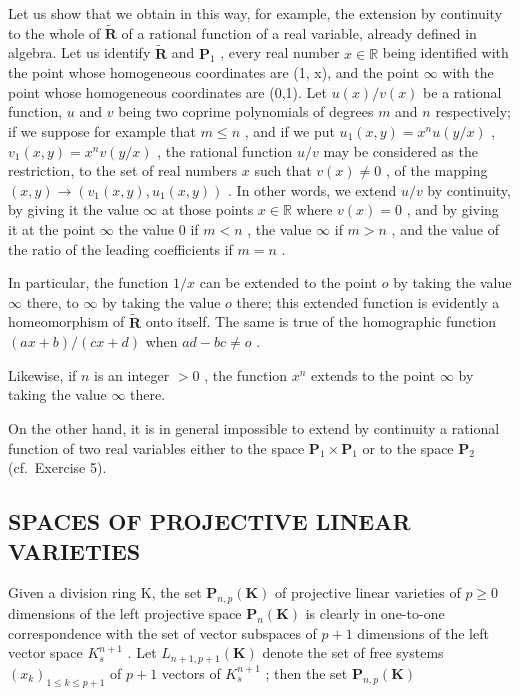 Let us show that we obtain in this way, for example, the extension by continuity to the whole of \(\tilde{\mathbf{R}}\) of a rational function of a real variable, already defined in algebra. Let us identify \(\tilde{\mathbf{R}}\) and \(\mathbf{P}_1\) , every real number \(x \in \mathbb{R}\) being identified with the point whose homogeneous coordinates are (1, x), and the point \(\infty\) with the point whose homogeneous coordinates are (0,1). Let \(u(x)/v(x)\) be a rational function, \(u\) and \(v\) being two coprime polynomials of degrees \(m\) and \(n\) respectively; if we suppose for example that \(m \leqslant n\) , and if we put \(u_1(x,y) = x^n u(y/x)\) , \(v_1(x,y) = x^n v(y/x)\) , the rational function \(u/v\) may be considered as the restriction, to the set of real numbers \(x\) such that \(v(x) \neq 0\) , of the mapping \((x,y) \to (v_1(x,y), u_1(x,y))\) . In other words, we extend \(u/v\) by continuity, by giving it the value \(\infty\) at those points \(x \in \mathbb{R}\) where \(v(x) = 0\) , and by giving it at the point \(\infty\) the value \(0\) if \(m < n\) , the value \(\infty\) if \(m > n\) , and the value of the ratio of the leading coefficients if \(m = n\) .

In particular, the function \(1 / x\) can be extended to the point \(o\) by taking the value \(\infty\) there, to \(\infty\) by taking the value \(o\) there; this extended function is evidently a homeomorphism of \(\tilde{\mathbf{R}}\) onto itself. The same is true of the homographic function \((ax + b) / (cx + d)\) when \(ad - bc \neq o\) .

Likewise, if \(n\) is an integer \(> 0\) , the function \(x^n\) extends to the point \(\infty\) by taking the value \(\infty\) there.

On the other hand, it is in general impossible to extend by continuity a rational function of two real variables either to the space \(\mathbf{P}_1 \times \mathbf{P}_1\) or to the space \(\mathbf{P}_2\) (cf.~Exercise 5).

\subsection{SPACES OF PROJECTIVE LINEAR VARIETIES}

Given a division ring K, the set \(\mathbf{P}_{n,p}(\mathbf{K})\) of projective linear varieties of \(p \geqslant 0\) dimensions of the left projective space \(\mathbf{P}_{n}(\mathbf{K})\) is clearly in one-to-one correspondence with the set of vector subspaces of \(p + 1\) dimensions of the left vector space \(K_{s}^{n+1}\) . Let \(L_{n+1, p+1}(\mathbf{K})\) denote the set of free systems \((x_{k})_{1 \leqslant k \leqslant p+1}\) of \(p + 1\) vectors of \(K_{s}^{n+1}\) ; then the set \(\mathbf{P}_{n,p}(\mathbf{K})\)

